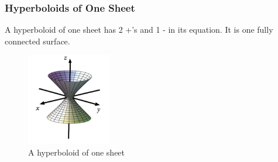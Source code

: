 \subsubsection{Hyperboloids of One Sheet}
\noindent
A hyperboloid of one sheet has 2 +'s and 1 - in its equation. It is one fully connected surface.

\begin{figure}[H]
	\centering
	\includegraphics[width=0.33\textwidth]{./Images/differentialMultivariableCalculus/one_sheet.png}
	\caption{A hyperboloid of one sheet}
\end{figure}